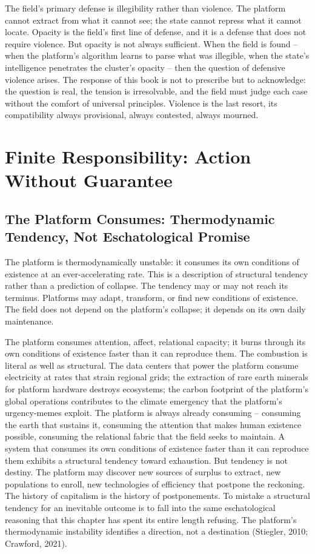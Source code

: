 The field's primary defense is illegibility rather than violence. The platform cannot extract from what it cannot see; the state cannot repress what it cannot locate. Opacity is the field's first line of defense, and it is a defense that does not require violence. But opacity is not always sufficient. When the field is found -- when the platform's algorithm learns to parse what was illegible, when the state's intelligence penetrates the cluster's opacity -- then the question of defensive violence arises. The response of this book is not to prescribe but to acknowledge: the question is real, the tension is irresolvable, and the field must judge each case without the comfort of universal principles. Violence is the last resort, its compatibility always provisional, always contested, always mourned.

\section{Finite Responsibility: Action Without Guarantee}

\subsection{The Platform Consumes: Thermodynamic Tendency, Not Eschatological Promise}

The platform is thermodynamically unstable: it consumes its own conditions of existence at an ever-accelerating rate. This is a description of structural tendency rather than a prediction of collapse. The tendency may or may not reach its terminus. Platforms may adapt, transform, or find new conditions of existence. The field does not depend on the platform's collapse; it depends on its own daily maintenance.

The platform consumes attention, affect, relational capacity; it burns through its own conditions of existence faster than it can reproduce them. The combustion is literal as well as structural. The data centers that power the platform consume electricity at rates that strain regional grids; the extraction of rare earth minerals for platform hardware destroys ecosystems; the carbon footprint of the platform's global operations contributes to the climate emergency that the platform's urgency-memes exploit. The platform is always already consuming -- consuming the earth that sustains it, consuming the attention that makes human existence possible, consuming the relational fabric that the field seeks to maintain. A system that consumes its own conditions of existence faster than it can reproduce them exhibits a structural tendency toward exhaustion. But tendency is not destiny. The platform may discover new sources of surplus to extract, new populations to enroll, new technologies of efficiency that postpone the reckoning. The history of capitalism is the history of postponements. To mistake a structural tendency for an inevitable outcome is to fall into the same eschatological reasoning that this chapter has spent its entire length refusing. The platform's thermodynamic instability identifies a direction, not a destination (Stiegler, 2010; Crawford, 2021).

